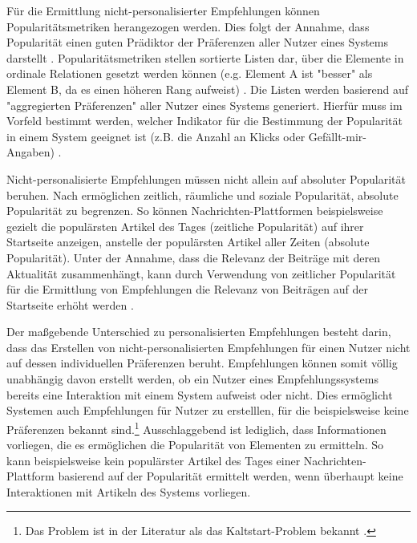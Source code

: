 Für die Ermittlung nicht-personalisierter Empfehlungen können Popularitätsmetriken herangezogen werden.
Dies folgt der Annahme, dass Popularität einen guten Prädiktor der Präferenzen aller Nutzer eines Systems darstellt \cite[S. 406]{unternährer:article}.
Popularitätsmetriken stellen sortierte Listen dar, über die Elemente in ordinale Relationen gesetzt werden können (e.g. Element A ist "besser" als Element B, da es einen höheren Rang aufweist) \cite[S. 404ff.]{unternährer:article}.
Die Listen werden basierend auf "aggregierten Präferenzen" aller Nutzer eines Systems generiert.
Hierfür muss im Vorfeld bestimmt werden, welcher Indikator für die Bestimmung der Popularität in einem System geeignet ist (z.B. die Anzahl an Klicks oder Gefällt-mir-Angaben) \cite[S. 406]{unternährer:article}.

Nicht-personalisierte Empfehlungen müssen nicht allein auf absoluter Popularität beruhen.
Nach \textcite[S. 405]{unternährer:article} ermöglichen zeitlich, räumliche und soziale Popularität, absolute Popularität zu begrenzen.
So können Nachrichten-Plattformen beispielsweise gezielt die populärsten Artikel des Tages (zeitliche Popularität) auf ihrer Startseite anzeigen, anstelle der populärsten Artikel aller Zeiten (absolute Popularität).
Unter der Annahme, dass die Relevanz der Beiträge mit deren Aktualität zusammenhängt, kann durch Verwendung von zeitlicher Popularität für die Ermittlung von Empfehlungen die Relevanz von Beiträgen auf der Startseite erhöht werden \cite[S. 405]{unternährer:article}.

Der maßgebende Unterschied zu personalisierten Empfehlungen besteht darin, dass das Erstellen von nicht-personalisierten Empfehlungen für einen Nutzer nicht auf dessen individuellen Präferenzen beruht.
Empfehlungen können somit völlig unabhängig davon erstellt werden, ob ein Nutzer eines Empfehlungssystems bereits eine Interaktion mit einem System aufweist oder nicht.
Dies ermöglicht Systemen auch Empfehlungen für Nutzer zu erstelllen, für die beispielsweise keine Präferenzen bekannt sind.\footnote{Das Problem ist in der Literatur als das Kaltstart-Problem bekannt \cite[S. 407]{unternährer:article}.}
Ausschlaggebend ist lediglich, dass Informationen vorliegen, die es ermöglichen die Popularität von Elementen zu ermitteln.
So kann beispielsweise kein populärster Artikel des Tages einer Nachrichten-Plattform basierend auf der Popularität ermittelt werden, wenn überhaupt keine Interaktionen mit Artikeln des Systems vorliegen.

